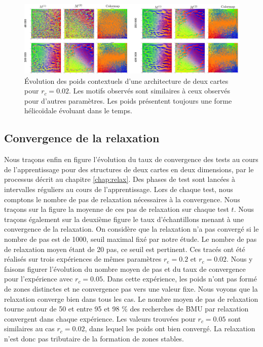 \documentclass[../main]{subfiles}
\begin{document}
\begin{figure}
	\includegraphics[width=\textwidth]{wc_rc002_evol.pdf}
	\caption{\'Evolution des poids contextuels d'une architecture de deux cartes pour $r_c =0.02$. Les motifs observés sont similaires à ceux observés pour d'autres paramètres. Les poids présentent toujours une forme hélicoïdale évoluant dans le temps. \label{fig:rc_002}}
\end{figure}




\subsection{Convergence de la relaxation}

Nous traçons enfin en figure \label{fig:relax} l'évolution du taux de convergence des tests au cours de l'apprentissage pour des structures de deux cartes en deux dimensions, par le
processus décrit au chapitre \ref{chap:relax}.
Des phases de test sont lancées à intervalles réguliers au cours de l'apprentissage. Lors de chaque test, nous comptons le nombre de pas de relaxation nécessaires à la convergence. Nous traçons sur la figure la moyenne de ces pas de relaxation sur chaque test $t$. 
Nous traçons également sur la deuxième figure le taux d'échantillons menant à une convergence de la relaxation. On considère que la relaxation n'a pas convergé si le nombre de pas est de 1000, seuil maximal fixé par notre étude. Le nombre de pas de relaxation moyen étant de 20 pas, ce seuil est pertinent. 
Ces tracés ont été réalisés sur trois expériences de mêmes paramètres $r_e=0.2$ et $r_c = 0.02$.
Nous y faisons figurer l'évolution du nombre moyen de pas et du taux de convergence pour l'expérience avec $r_c = 0.05$. Dans cette expérience, les poids n'ont pas formé de zones distinctes et ne convergence pas vers une valeur fixe.
Nous voyons que la relaxation converge bien dans tous les cas. Le nombre moyen de pas de relaxation tourne autour de 50 et entre 95 et 98 \% des recherches de BMU par relaxation convergent dans chaque expérience. 
Les valeurs trouvées pour $r_c = 0.05$ sont similaires au cas $r_c = 0.02$, dans lequel les poids ont bien convergé. La relaxation n'est donc pas tributaire de la formation de zones stables.
\end{document}
